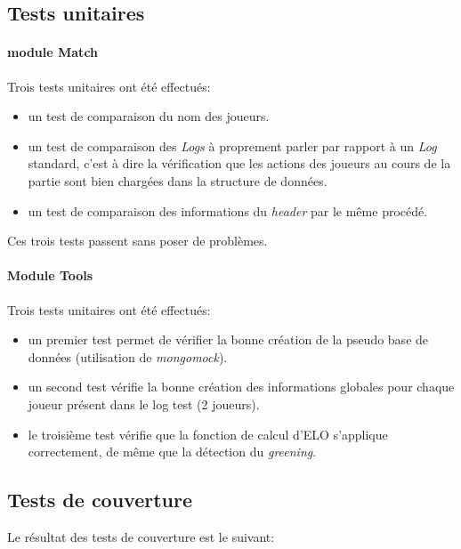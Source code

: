 \subsection{Tests unitaires}
\paragraph{module Match}
Trois tests unitaires ont été effectués:
\begin{itemize}
\item un test de comparaison du nom des joueurs.
\item un test de comparaison des \textit{Logs} à proprement parler par rapport à un \textit{Log} standard, c'est à dire la vérification que les actions des joueurs au cours de la partie sont bien chargées dans la structure de données. 
\item un test de comparaison des informations du \textit{header} par le même procédé.
\end{itemize}

Ces trois tests passent sans poser de problèmes.

\paragraph{Module Tools}
Trois tests unitaires ont été effectués:
\begin{itemize}
\item un premier test permet de vérifier la bonne création de la pseudo base de données (utilisation de \textit{mongomock}).
\item un second test vérifie la bonne création des informations globales pour chaque joueur présent dans le log test (2 joueurs).
\item le troisième test vérifie que la fonction de calcul d'ELO s'applique correctement, de même que la détection du \textit{greening}.
\end{itemize}

\subsection{Tests de couverture}
Le résultat des tests de couverture est le suivant:

